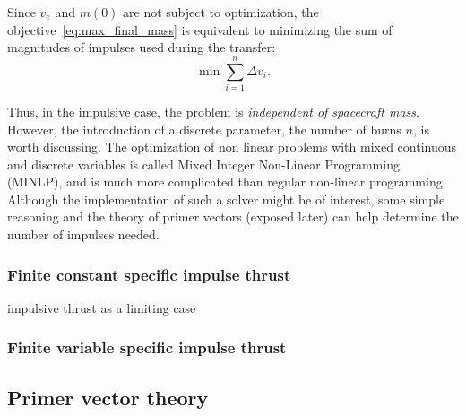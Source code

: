 Since \(v_e\) and \(m(0)\) are not subject to optimization, the objective~\eqref{eq:max_final_mass} is equivalent to minimizing the sum of magnitudes of impulses used during the transfer:
\begin{equation}
    \min \sum_{i=1}^{n} \Delta v_i.
\end{equation}

Thus, in the impulsive case, the problem is \textit{independent of spacecraft mass}. However, the introduction of a discrete parameter, the number of burns \(n\), is worth discussing. The optimization of non linear problems with mixed continuous and discrete variables is called Mixed Integer Non-Linear Programming (MINLP), and is much more complicated than regular non-linear programming. Although the implementation of such a solver might be of interest, some simple reasoning and the theory of primer vectors (exposed later) can help determine the number of impulses needed.

\subsubsection{Finite constant specific impulse thrust}


impulsive thrust as a limiting case

\subsubsection{Finite variable specific impulse thrust}

\subsection{Primer vector theory}

